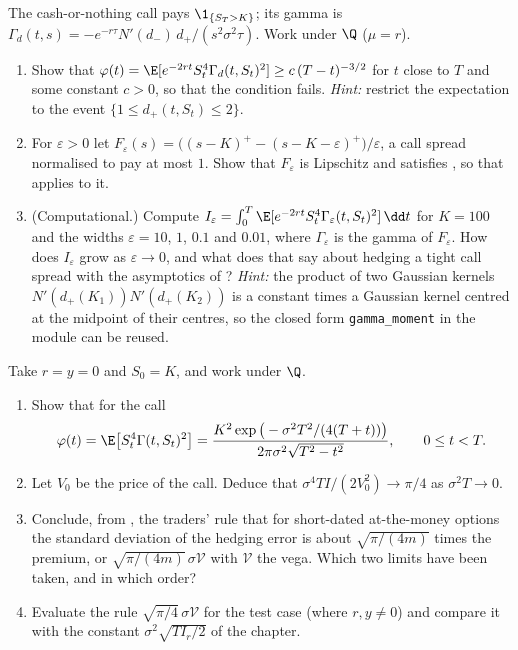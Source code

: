 \begin{exercise}\label{ex:hd-integrability}
\medium The cash-or-nothing call pays $\1_{\{S_T>K\}}$; its gamma is
$\Gamma_d(t,s)=-e^{-r\tau}N'(d_-)\,d_+/(s^2\sigma^2\tau)$. Work under $\Q$ ($\mu=r$).
\begin{enumerate}[label=(\alph*)]
  \item Show that $\varphi(t)=\E[e^{-2rt}S_t^4\Gamma_d(t,S_t)^2]\ge c\,(T-t)^{-3/2}$ for $t$ close to $T$ and
    some constant $c>0$, so that the condition  fails. \emph{Hint:}
    restrict the expectation to the event $\{1\le d_+(t,S_t)\le2\}$.
  \item For $\varepsilon>0$ let $F_\varepsilon(s)=\big((s-K)^+-(s-K-\varepsilon)^+\big)/\varepsilon$, a call spread normalised to
    pay at most $1$. Show that $F_\varepsilon$ is Lipschitz and satisfies
    , so that  applies to it.
  \item (Computational.) Compute $I_\varepsilon=\int_0^T\E[e^{-2rt}S_t^4\Gamma_\varepsilon(t,S_t)^2]\,\dd t$ for $K=100$ and the
    widths $\varepsilon=10$, $1$, $0.1$ and $0.01$, where $\Gamma_\varepsilon$ is the gamma of $F_\varepsilon$. How does $I_\varepsilon$ grow as $\varepsilon\to0$, and
    what does that say about hedging a tight call spread with the asymptotics of
    ? \emph{Hint:} the product of two Gaussian kernels
    $N'(d_+(K_1))N'(d_+(K_2))$ is a constant times a Gaussian kernel centred at the midpoint of
    their centres, so the closed form \texttt{gamma\_moment} in the module
     can be reused.
\end{enumerate}
\end{exercise}

\begin{exercise}\label{ex:hd-kamal-derman}
\medium Take $r=y=0$ and $S_0=K$, and work under $\Q$.
\begin{enumerate}[label=(\alph*)]
  \item Show that for the call
    \[
      \varphi(t)=\E\big[S_t^4\Gamma(t,S_t)^2\big]=\frac{K^2\exp\big(-\sigma^2T^2/(4(T+t))\big)}{2\pi\sigma^2\sqrt{T^2-t^2}},
      \qquad0\le t<T .
    \]
  \item Let $V_0$ be the price of the call. Deduce that $\sigma^4TI/(2V_0^2)\to\pi/4$ as $\sigma^2T\to0$.
  \item Conclude, from , the traders' rule that for short-dated
    at-the-money options the standard deviation of the hedging error is about
    $\sqrt{\pi/(4m)}$ times the premium, or $\sqrt{\pi/(4m)}\,\sigma\mathcal V$ with $\mathcal V$ the vega. Which
    two limits have been taken, and in which order?
  \item Evaluate the rule $\sqrt{\pi/4}\,\sigma\mathcal V$ for the test case (where $r,y\ne0$) and compare
    it with the constant $\sigma^2\sqrt{TI_r/2}$ of the chapter.
\end{enumerate}
\end{exercise}

